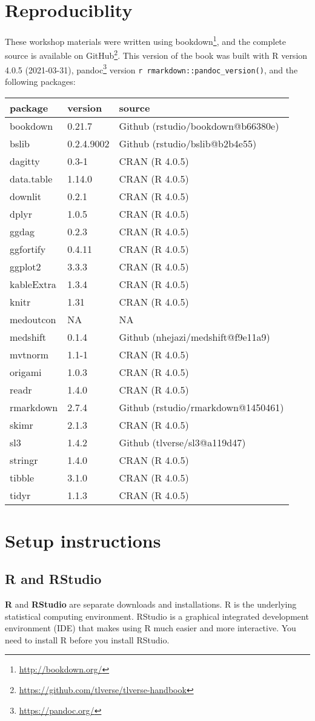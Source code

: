 \documentclass[
  12pt, krantz2,
]{book}
\renewcommand{\href}[2]{#2\footnote{\url{#1}}}
\theoremstyle{definition}
\theoremstyle{definition}
\theoremstyle{definition}
\newcommand{\1}{\mathbbm{1}}
\begin{document}
\hypertarget{repro}{%
\section{Reproduciblity}\label{repro}}

These workshop materials were written using \href{http://bookdown.org/}{bookdown},
and the complete source is available on
\href{https://github.com/tlverse/tlverse-handbook}{GitHub}. This version of the book
was built with R version 4.0.5 (2021-03-31), \href{https://pandoc.org/}{pandoc} version \texttt{r\ rmarkdown::pandoc\_version()}, and the following packages:

\begin{longtable}[]{@{}lll@{}}
\toprule
package & version & source\tabularnewline
\midrule
\endhead
bookdown & 0.21.7 & Github (rstudio/bookdown@b66380e)\tabularnewline
bslib & 0.2.4.9002 & Github (rstudio/bslib@b2b4e55)\tabularnewline
dagitty & 0.3-1 & CRAN (R 4.0.5)\tabularnewline
data.table & 1.14.0 & CRAN (R 4.0.5)\tabularnewline
downlit & 0.2.1 & CRAN (R 4.0.5)\tabularnewline
dplyr & 1.0.5 & CRAN (R 4.0.5)\tabularnewline
ggdag & 0.2.3 & CRAN (R 4.0.5)\tabularnewline
ggfortify & 0.4.11 & CRAN (R 4.0.5)\tabularnewline
ggplot2 & 3.3.3 & CRAN (R 4.0.5)\tabularnewline
kableExtra & 1.3.4 & CRAN (R 4.0.5)\tabularnewline
knitr & 1.31 & CRAN (R 4.0.5)\tabularnewline
medoutcon & NA & NA\tabularnewline
medshift & 0.1.4 & Github (nhejazi/medshift@f9e11a9)\tabularnewline
mvtnorm & 1.1-1 & CRAN (R 4.0.5)\tabularnewline
origami & 1.0.3 & CRAN (R 4.0.5)\tabularnewline
readr & 1.4.0 & CRAN (R 4.0.5)\tabularnewline
rmarkdown & 2.7.4 & Github (rstudio/rmarkdown@1450461)\tabularnewline
skimr & 2.1.3 & CRAN (R 4.0.5)\tabularnewline
sl3 & 1.4.2 & Github (tlverse/sl3@a119d47)\tabularnewline
stringr & 1.4.0 & CRAN (R 4.0.5)\tabularnewline
tibble & 3.1.0 & CRAN (R 4.0.5)\tabularnewline
tidyr & 1.1.3 & CRAN (R 4.0.5)\tabularnewline
\bottomrule
\end{longtable}

\hypertarget{setup}{%
\section{Setup instructions}\label{setup}}

\hypertarget{r-and-rstudio}{%
\subsection{R and RStudio}\label{r-and-rstudio}}

\textbf{R} and \textbf{RStudio} are separate downloads and installations. R is the
underlying statistical computing environment. RStudio is a graphical integrated
development environment (IDE) that makes using R much easier and more
interactive. You need to install R before you install RStudio.
\end{document}
